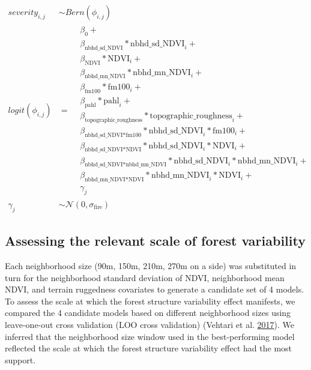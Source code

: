 \documentclass[twoside,12pt,final]{ucthesis-CA2012}
\begin{document}
\begin{ucmainmatter}
\begin{enumerate}
  \(\begin{aligned} \label{eq-severity-model} severity_{i, j} &\sim Bern(\phi_{i,j}) \\ logit(\phi_{i,j}) &= \begin{aligned} & \beta_0 + \\ & \beta_{\text{nbhd\_sd\_NDVI}} * \text{nbhd\_sd\_NDVI}_i + \\ & \beta_{\text{NDVI}} * \text{NDVI}_i + \\ & \beta_{\text{nbhd\_mn\_NDVI}} * \text{nbhd\_mn\_NDVI}_i + \\ & \beta_{\text{fm100}} * \text{fm100}_i + \\ & \beta_{\text{pahl}} * \text{pahl}_i + \\ & \beta_{\text{topographic\_roughness}} * \text{topographic\_roughness}_i + \\ & \beta_{\text{nbhd\_sd\_NDVI*fm100}} * \text{nbhd\_sd\_NDVI}_i * \text{fm100}_i + \\ & \beta_{\text{nbhd\_sd\_NDVI*NDVI}} * \text{nbhd\_sd\_NDVI}_i * \text{NDVI}_i + \\ & \beta_{\text{nbhd\_sd\_NDVI*nbhd\_mn\_NDVI}} * \text{nbhd\_sd\_NDVI}_i * \text{nbhd\_mn\_NDVI}_i + \\ & \beta_{\text{nbhd\_mn\_NDVI*NDVI}} * \text{nbhd\_mn\_NDVI}_i * \text{NDVI}_i + \\ & \gamma_j \end{aligned} \\ \gamma_j &\sim \mathcal{N}(0, \sigma_{\text{fire}}) \end{aligned}\)
\end{enumerate}
\subsection{Assessing the relevant scale of forest
variability}\label{assessing-the-relevant-scale-of-forest-variability}

Each neighborhood size (90m, 150m, 210m, 270m on a side) was substituted
in turn for the neighborhood standard deviation of NDVI, neighborhood
mean NDVI, and terrain ruggedness covariates to generate a candidate set
of 4 models. To assess the scale at which the forest structure
variability effect manifests, we compared the 4 candidate models based
on different neighborhood sizes using leave-one-out cross validation
(LOO cross validation) (Vehtari et al.
\protect\hyperlink{ref-vehtari2017}{2017}). We inferred that the
neighborhood size window used in the best-performing model reflected the
scale at which the forest structure variability effect had the most
support.


\end{ucmainmatter}
\end{document}
